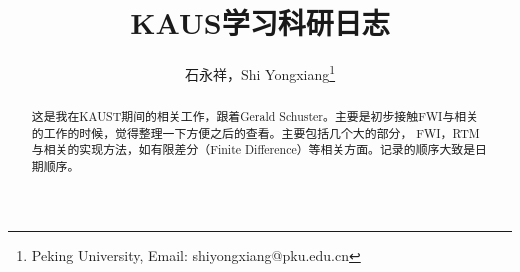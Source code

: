 \documentclass[UTF8, 10pt, a4paper]{article}
\title{KAUS学习科研日志}
\author{石永祥，Shi Yongxiang\footnote{Peking University, Email: shiyongxiang@pku.edu.cn}}
\begin{document}
    \maketitle
    \begin{abstract}
        这是我在KAUST期间的相关工作，跟着Gerald Schuster。主要是初步接触FWI与相关的工作的时候，觉得整理一下方便之后的查看。主要包括几个大的部分， FWI，RTM与相关的实现方法，如有限差分（Finite Difference）等相关方面。记录的顺序大致是日期顺序。
    \end{abstract}
    
\end{document}

